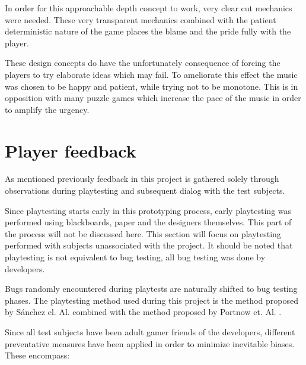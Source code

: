 In order for this approachable depth concept to work, very clear cut
mechanics were needed. These very transparent mechanics combined with
the patient deterministic nature of the game places the blame and the
pride fully with the player.

These design concepts do have the unfortunately consequence of forcing
the players to try elaborate ideas which may fail. To ameliorate this
effect the music was chosen to be happy and patient, while trying not
to be monotone. This is in opposition with many puzzle games which
increase the pace of the music in order to amplify the urgency.


\section{Player feedback}
\label{player-feedback}
As mentioned previously feedback in this project is gathered solely
through observations during playtesting and subsequent dialog with the
test subjects.

Since playtesting starts early in this prototyping process, early
playtesting was performed using blackboards, paper and the designers
themselves. This part of the process will not be discussed here.  This
section will focus on playtesting performed with subjects unassociated
with the project.  It should be noted that playtesting is not
equivalent to bug testing, all bug testing was done by developers.

Bugs randomly encountered during playtests are naturally shifted to
bug testing phases.  The playtesting method used during this project
is the method proposed by Sánchez el. Al. \cite{sanchez09} combined
with the method proposed by Portnow et. Al. \cite{portnow}.

Since all test subjects have been adult gamer friends of the
developers, different preventative measures have been applied in order
to minimize inevitable biases. These encompass:

